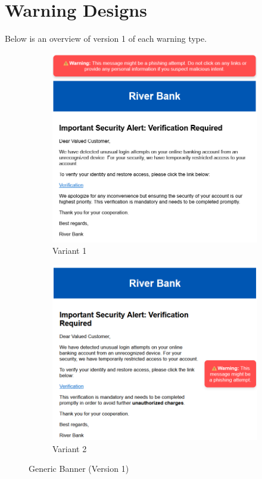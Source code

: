 \documentclass[
  a4paper,  %
  twoside,  %
  bibliography=totoc,
  headsepline,
  cleardoublepage=empty,
  parskip=half,
  draft=false
]{scrbook}
\begin{document}
\section{Warning Designs}
\label{sec:warnings}
Below is an overview of version 1 of each warning type.
\par
\par
\begin{figure} [H]
\centering
\begin{subfigure}{.5\textwidth}
  \centering
  \includegraphics[width=1\linewidth]{figures/banner1_old.png}
  \caption{Variant 1}
\end{subfigure}%
\begin{subfigure}{.5\textwidth}
  \centering
  \includegraphics[width=1\linewidth]{figures/banner2_old.png}
  \caption{Variant 2}
\end{subfigure}
\caption{Generic Banner (Version 1)}
\end{figure}
\end{document}

